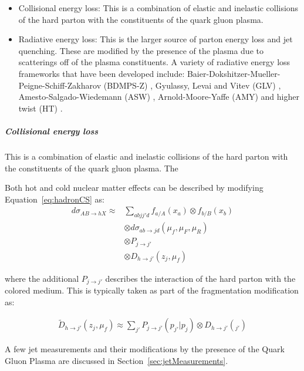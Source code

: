 \begin{itemize}
\item Collisional energy loss: This is a combination of elastic and inelastic collisions of the hard parton with the constituents of the quark gluon plasma. 
\item Radiative energy loss: This is the larger source of parton energy loss and jet quenching. These are modified by the presence of the plasma due to scatterings off of the plasma constituents. A variety of radiative energy loss frameworks that have been developed include: Baier-Dokshitzer-Mueller-Peigne-Schiff-Zakharov (BDMPS-Z) \cite{BAIER1997291}, Gyulassy, Levai and Vitev (GLV) \cite{Gyulassy:1999zd}, Amesto-Salgado-Wiedemann (ASW) \cite{Wiedemann:2000za},  Arnold-Moore-Yaffe (AMY) \cite{Arnold:2001ba} and higher twist (HT) \cite{Guo:2000nz}.
\end{itemize}

\subparagraph{Collisional energy loss} This is a combination of elastic and inelastic collisions of the hard parton with the constituents of the quark gluon plasma. The 

Both hot and cold nuclear matter effects can be described by modifying Equation~\ref{eq:hadronCS} as:
\begin{align}
d \sigma_{AB \rightarrow hX}  \approx & \sum_{abjj'd} f_{a/A} (x_a) \otimes f_{b/B} (x_b) \\ 
& \otimes d\sigma_{ab\rightarrow jd} (\mu_f, \mu_F, \mu_R)  \nonumber \\
& \otimes P_{j\rightarrow j'} \nonumber \\
& \otimes D_{h \rightarrow j'} (z_j, \mu_f) \nonumber 
\end{align}

where the additional $P_{j\rightarrow j'}$ describes the interaction of the hard parton with the colored medium. This is typically taken as part of the fragmentation modification as:

\begin{align}
\widetilde{D}_{h \rightarrow j'} (z_j, \mu_f) \approx \sum_{j'} P_{j\rightarrow j'} (p_{j'} | p_j) \otimes D_{h\rightarrow j'} (_{j'})
\end{align}

A few jet measurements and their modifications by the presence of the Quark Gluon Plasma are discussed in Section~\ref{sec:jetMeasurements}.


%
%
%
%
%
%
%
%


